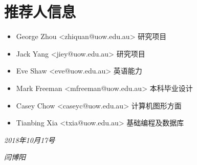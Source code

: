 \documentclass[]{friggeri-cv}
\begin{document}
\section{推荐人信息}
\begin{itemize}
	\item George Zhou <zhiquan@uow.edu.au> 研究项目
	
	\item Jack Yang <jiey@uow.edu.au> 研究项目
	
	\item Eve Shaw <eve@uow.edu.au> 英语能力
	
	\item Mark Freeman <mfreeman@uow.edu.au> 本科毕业设计
	
	\item Casey Chow <caseyc@uow.edu.au> 计算机图形方面
	
	\item Tianbing Xia <txia@uow.edu.au> 基础编程及数据库
\end{itemize}



\begin{flushleft}
\emph{2018年10月17号}
\end{flushleft}
\begin{flushright}
\emph{闫博阳}
\end{flushright}

% 
\end{document}
